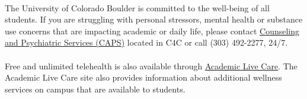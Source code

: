 \documentclass[11pt]{article}
\begin{document}
\\
The University of Colorado Boulder is committed to the well-being of all students. If you are struggling with personal stressors, mental health or substance use concerns that are impacting academic or daily life, please contact \href{https://www.colorado.edu/counseling/}{Counseling and Psychiatric Services (CAPS)} located in C4C or call (303) 492-2277, 24/7.\\
\\
Free and unlimited telehealth is also available through \href{https://www.colorado.edu/health/academiclivecare}{Academic Live Care}. The Academic Live Care site also provides information about additional wellness services on campus that are available to students.
\end{document}
